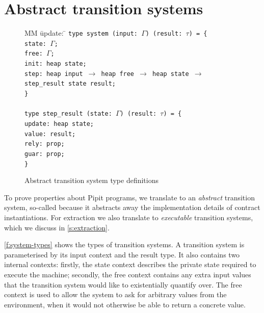 \documentclass[a4paper,UKenglish,cleveref, autoref, thm-restate,anonymous]{lipics-v2021}
\begin{document}
 







 

\section{Abstract transition systems}
\label{s:transition}


\begin{figure}
  \begin{tabbing}
  MM \= update: \= \kill
  \tt{type} system (input: $\Gamma$) (result: $\tau$) = \{ \\
  \> state:  \> $\Gamma$; \\
  \> free: \> $\Gamma$; \\
  \> init: \> heap state; \\
  \> step: \> heap input $\to$ heap free $\to$ heap state $\to$ step_result state result; \\
  \} \\
  \\
  \tt{type} step_result (state: $\Gamma$) (result: $\tau$) = \{ \\
  \> update:  \> heap state; \\
  \> value: \> result; \\
  \> rely: \> \tt{prop}; \\
  \> guar: \> \tt{prop}; \\
  \}
  \end{tabbing}
  \caption{Abstract transition system type definitions}
  \label{f:system-types}
\end{figure} 
To prove properties about Pipit programs, we translate to an \emph{abstract} transition system, so-called because it abstracts away the implementation details of contract instantiations.
For extraction we also translate to \emph{executable} transition systems, which we discuss in \autoref{s:extraction}.

\autoref{f:system-types} shows the types of transition systems.
A transition system is parameterised by its input context and the result type.
It also contains two internal contexts: firstly, the state context describes the private state required to execute the machine; secondly, the free context contains any extra input values that the transition system would like to existentially quantify over.
The free context is used to allow the system to ask for arbitrary values from the environment, when it would not otherwise be able to return a concrete value.
\end{document}
